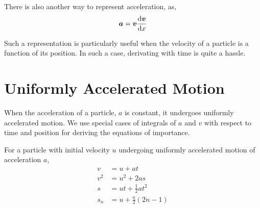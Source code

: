 There is also another way to represent acceleration, as, \[
    \boldsymbol{a} = \boldsymbol{v}\dv{\boldsymbol{v}}{x}
\]

Such a representation is particularly useful when the velocity of a particle 
is a function of its position. In such a case, derivating with time is quite a hassle.

\section{Uniformly Accelerated Motion}

When the acceleration of a particle, \(a\) is constant, it undergoes uniformly accelerated motion.
We use special cases of integrals of \(a\) and \(v\) with respect to time and position for deriving
the equations of importance.

\begin{theorem}
    For a particle with initial velocity \(u\) undergoing uniformly accelerated motion of acceleration \(a\),
    \begin{align}
        v &= u + at \\
        v^2 &= u^2 + 2as \\
        s &= ut + \frac{1}{2} at^2 \\
        s_{n} &= u + \frac{a}{2}(2n - 1)
    \end{align}
\end{theorem}



